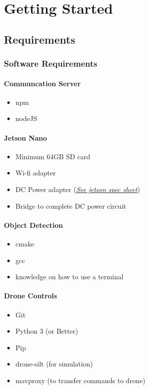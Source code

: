 \chapter{Getting Started}

\section{Requirements}
\subsection{Software Requirements}

\subsubsection{Communcation Server}
\begin{itemize}
    \item npm
    \item nodeJS
\end{itemize}

\subsubsection{Jetson Nano}
\begin{itemize}
    \item Minimum 64GB SD card
    \item Wi-fi adapter
    \item DC Power adapter (\href{https://www.docdroid.net/yGXIxZu/data-sheet-nvidia-jetson-tx2-system-on-module.pdf}{\textit{See jetson spec sheet}})
    \item Bridge to complete DC power circuit
\end{itemize}

\subsubsection{Object Detection \cite{darknet}}
\begin{itemize}
    \item cmake
    \item gcc
    \item knowledge on how to use a terminal
\end{itemize}

\subsubsection{Drone Controls}
\begin{itemize}
    \item Git
    \item Python 3 (or Better)
    \item Pip
    \item drone-silt (for simulation) \cite{dronekit}
    \item mavproxy (to transfer commands to drone) \cite{mavproxy}
\end{itemize}

